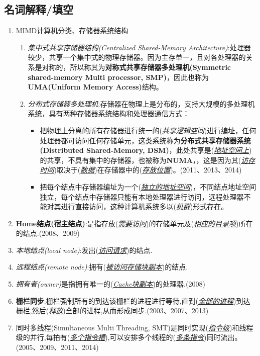 \documentclass[a4paper]{ctexart}
\newcommand{\blank}[1]{(\emph{\underline{#1}})}
\begin{document}
\subsection{名词解释/填空}
\begin{enumerate}
  \item MIMD计算机分类、存储器系统结构
  \begin{enumerate}
    \item \emph{集中式共享存储器结构(Centralized Shared-Memory Architecture)}:处理器较少，共享一个集中式的物理存储器。因为主存单一，且对各处理器的关系是对称的，所以称其为\textbf{对称式共享存储器多处理机(Symmetric shared-memory Multi processor, SMP)}，因此也称为\textbf{UMA(Uniform Memory Access)}结构。
    \item \emph{分布式存储器多处理机}:存储器在物理上是分布的，支持大规模的多处理机系统，具有两种存储器系统结构和处理器通信方式：
    \begin{itemize}
      \item 把物理上分离的所有存储器进行统一的\blank{共享逻辑空间}进行编址，任何处理器都可访问任何存储单元，这类系统称为\textbf{分布式共享存储器系统(Distributed Shared-Memory, DSM)}，此处共享是\blank{地址空间上}的共享，不具有集中的存储器，也被称为\textbf{NUMA}，，这是因为其\blank{访存时间}取决于\blank{数据}在存储器中的\blank{存放位置}。(2011、2013、2014)
      \item 把每个结点中存储器编址为一个\blank{独立的地址空间}，不同结点地址空间独立，每个结点中存储器只能有本地处理器进行访问，远程处理器不能对其进行直接访问，这种计算机系统多以\blank{机群}形式存在。
    \end{itemize}
  \end{enumerate}
  \item \textbf{Home结点(宿主结点)}:是指存放\blank{需要访问}的存储单元及\blank{相应的目录项}所在的结点.(2008、2009)
  \item \emph{本地结点(local node)}:发出\blank{访问请求}的结点.
  \item \emph{远程结点(remote node)}:拥有\blank{被访问存储块副本}的结点.
  \item \emph{拥有者(owner)}是指拥有唯一的\blank{Cache块副本}的处理器.(2008)
  \item \textbf{栅栏同步}:栅栏强制所有的到达该栅栏的进程进行等待,直到(\emph{\underline{全部的进程}})到达栅栏,然后(\emph{\underline{释放}})全部的进程,从而形成同步.(2003、2007、2013)
  \item 同时多线程(Simultaneous Multi Threading, SMT)是同时实现(\emph{\underline{指令级}})和线程级的并行,每拍有(\emph{\underline{多个指令槽}}),可以安排多个线程的(\emph{\underline{多条指令}})同时流出。(2005、2009、2011、2014)

\end{enumerate}
\end{document}
